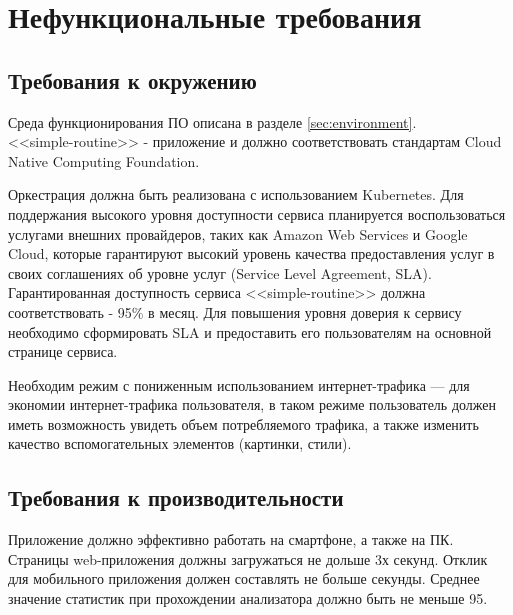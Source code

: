 \chapter{Нефункциональные требования}
\label{ch:nonfunctional}

\section{Требования к окружению}
Среда функционирования ПО описана в разделе \ref{sec:environment}.\\ <<simple-routine>> - \href{https://github.com/cncf/toc/blob/main/DEFINITION.md#\%D1\%80\%D1\%83\%D1\%81\%D1\%81\%D0\%BA\%D0\%B8\%D0\%B9}{\color{blue}{cloud native}} приложение и должно соответствовать стандартам Cloud Native Computing Foundation. 

Оркестрация должна быть реализована с использованием Kubernetes. Для поддержания высокого уровня доступности сервиса планируется воспользоваться услугами внешних провайдеров, таких как Amazon Web Services и Google Cloud, которые гарантируют высокий уровень качества предоставления услуг в своих соглашениях об уровне услуг (Service Level Agreement, SLA). Гарантированная доступность сервиса <<simple-routine>> должна соответствовать - 95\% в месяц. Для повышения уровня доверия к сервису необходимо сформировать SLA и предоставить его пользователям на основной странице сервиса. 

Необходим режим с пониженным использованием интернет-трафика --- для экономии интернет-трафика пользователя, в таком режиме пользователь должен иметь возможность увидеть объем потребляемого трафика, а также изменить качество вспомогательных элементов (картинки, стили).

\section{Требования к производительности}
Приложение должно эффективно работать на смартфоне, а также на ПК. Страницы web-приложения должны загружаться не дольше 3х секунд. Отклик для мобильного приложения должен составлять не больше секунды. Среднее значение статистик при прохождении анализатора \href{https://developers.google.com/web/tools/lighthouse}{\color{blue}{Google Lighthouse}} должно быть не меньше 95.


